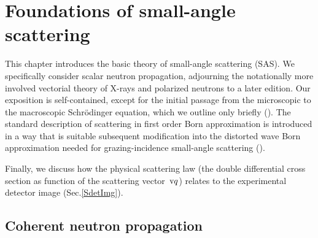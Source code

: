 
\chapter{Foundations of small-angle scattering}  \label{SSas}

%

This chapter introduces the basic theory of small-angle scattering (SAS).
We specifically consider scalar neutron propagation,
adjourning the notationally more involved
vectorial theory of X-rays and polarized neutrons
to a later edition. %
Our exposition is self-contained,
except for the initial passage from the microscopic
to the macroscopic Schrödinger equation,
which we outline only briefly ().
The standard description of scattering in first order Born approximation
is introduced in a way that is suitable subsequent modification
into the distorted wave Born approximation
needed for grazing-incidence small-angle scattering ().

Finally, we discuss how the physical scattering law
(the double differential cross section as function of the scattering vector~$\text{v}{q}$)
relates to the experimental detector image (Sec.\ref{SdetImg}).


\section{Coherent neutron propagation}\label{Swave}
%
%

